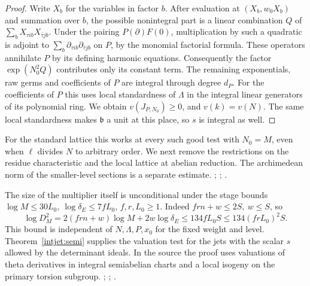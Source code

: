 \begin{proof}
Write \(X_b\) for the variables in factor \(b\).
After evaluation at \((X_b,w_0X_b)\) and summation over \(b\),
the possible nonintegral part is a linear combination \(Q\) of
\(\sum_b X_{\tau i b}X_{\bar\tau j b}\).
Under the pairing \(P(\partial)F(0)\), multiplication by such a
quadratic is adjoint to \(\sum_b\partial_{\tau i b}
\partial_{\bar\tau j b}\) on \(P\), by the monomial factorial formula.
These operators annihilate \(P\) by its defining harmonic equations.
Consequently the factor \(\exp(N_0^2 Q)\) contributes only its
constant term. The remaining exponentials, raw germs and coefficients
of \(P\) are integral through degree \(d_P\). For the coefficients
of \(P\) this uses local standardness of \(\Lambda\) in the
integral linear generators of its polynomial ring.
We obtain \(v(J_{P,N_0})\ge0\), and \(v(k)=v(N)\).
The same local standardness makes \(\mathfrak b\) a unit at this
place, so \(s\) is integral as well.
\end{proof}
For the standard lattice this works at every such good test with
\(N_0=M\), even when \(\ell\) divides \(N\) to arbitrary order.
We next remove the restrictions on the residue characteristic and
the local lattice at abelian reduction. The archimedean norm
of the smaller-level sections is a separate estimate.
;
;
.



The size of the multiplier itself is unconditional under the stage
bounds \(\log M\le30L_0,\ \log\delta_E\le7fL_0\),
\(f,r,L_0\ge1\). Indeed \(frn+w\le2S,\ w\le S\), so
\[
 \log D_M^2
 =2(frn+w)\log M+2w\log\delta_E
 \le134 f L_0 S\le134(frL_0)^2 S .
\]
This bound is independent of \(N,\Lambda,P,x_0\) for the fixed
weight and level. Theorem~\ref{intjet:semi} supplies the valuation
test for the jets with the scalar \(s\) allowed by the determinant
ideals. In the source the proof uses valuations of theta
derivatives in integral semiabelian charts and a local isogeny on
the primary torsion subgroup.
;
;
.

